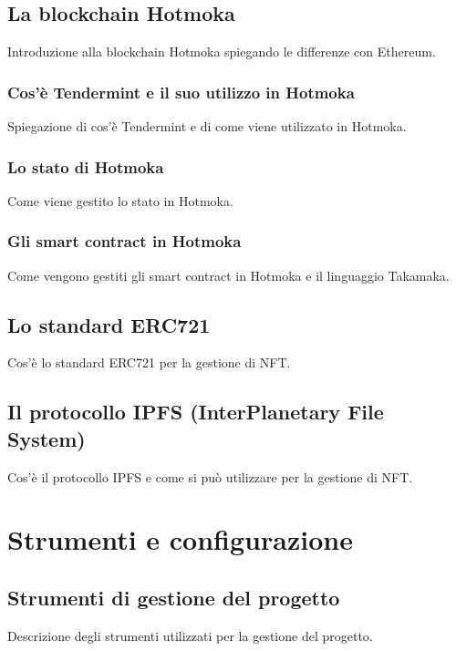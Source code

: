 
\subsection{La blockchain Hotmoka}
Introduzione alla blockchain Hotmoka spiegando le differenze con Ethereum.

\subsubsection{Cos'è Tendermint e il suo utilizzo in Hotmoka}
Spiegazione di cos'è Tendermint e di come viene utilizzato in Hotmoka.

\subsubsection{Lo stato di Hotmoka}
Come viene gestito lo stato in Hotmoka.

\subsubsection{Gli smart contract in Hotmoka}
Come vengono gestiti gli smart contract in Hotmoka e il linguaggio Takamaka.

\subsection{Lo standard ERC721}
Cos'è lo standard ERC721 per la gestione di NFT.

\subsection{Il protocollo IPFS (InterPlanetary File System)}
Cos'è il protocollo IPFS e come si può utilizzare per la gestione di NFT.


\section{Strumenti e configurazione}

\subsection{Strumenti di gestione del progetto}
Descrizione degli strumenti utilizzati per la gestione del progetto.

